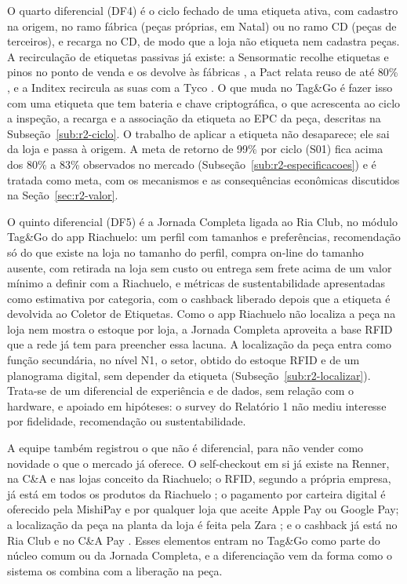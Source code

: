 O quarto diferencial (DF4) é o ciclo fechado de uma etiqueta ativa, com cadastro na origem, no ramo fábrica (peças próprias, em Natal) ou no ramo CD (peças de terceiros), e recarga no CD, de modo que a loja não etiqueta nem cadastra peças. A recirculação de etiquetas passivas já existe: a Sensormatic recolhe etiquetas e pinos no ponto de venda e os devolve às fábricas \cite{sensormatic2024recirculacao}, a Pact relata reuso de até 80\% \cite{pact2026etiquetas}, e a Inditex recircula as suas com a Tyco \cite{rfidjournal2014inditex}. O que muda no Tag\&Go é fazer isso com uma etiqueta que tem bateria e chave criptográfica, o que acrescenta ao ciclo a inspeção, a recarga e a associação da etiqueta ao EPC da peça, descritas na Subseção~\ref{sub:r2-ciclo}. O trabalho de aplicar a etiqueta não desaparece; ele sai da loja e passa à origem. A meta de retorno de 99\% por ciclo (S01) fica acima dos 80\% a 83\% observados no mercado (Subseção~\ref{sub:r2-especificacoes}) e é tratada como meta, com os mecanismos e as consequências econômicas discutidos na Seção~\ref{sec:r2-valor}.

O quinto diferencial (DF5) é a Jornada Completa ligada ao Ria Club, no módulo Tag\&Go do app Riachuelo: um perfil com tamanhos e preferências, recomendação só do que existe na loja no tamanho do perfil, compra on-line do tamanho ausente, com retirada na loja sem custo ou entrega sem frete acima de um valor mínimo a definir com a Riachuelo, e métricas de sustentabilidade apresentadas como estimativa por categoria, com o cashback liberado depois que a etiqueta é devolvida ao Coletor de Etiquetas. Como o app Riachuelo não localiza a peça na loja nem mostra o estoque por loja, a Jornada Completa aproveita a base RFID que a rede já tem para preencher essa lacuna. A localização da peça entra como função secundária, no nível N1, o setor, obtido do estoque RFID e de um planograma digital, sem depender da etiqueta (Subseção~\ref{sub:r2-localizar}). Trata-se de um diferencial de experiência e de dados, sem relação com o hardware, e apoiado em hipóteses: o survey do Relatório 1 não mediu interesse por fidelidade, recomendação ou sustentabilidade.

A equipe também registrou o que não é diferencial, para não vender como novidade o que o mercado já oferece. O self-checkout em si já existe na Renner, na C\&A e nas lojas conceito da Riachuelo; o RFID, segundo a própria empresa, já está em todos os produtos da Riachuelo \cite{neofeed2025riachuelo}; o pagamento por carteira digital é oferecido pela MishiPay e por qualquer loja que aceite Apple Pay ou Google Pay; a localização da peça na planta da loja é feita pela Zara \cite{inditex2021storemode}; e o cashback já está no Ria Club e no C\&A Pay \cite{midway2026riaclub,cea2026pay}. Esses elementos entram no Tag\&Go como parte do núcleo comum ou da Jornada Completa, e a diferenciação vem da forma como o sistema os combina com a liberação na peça.

